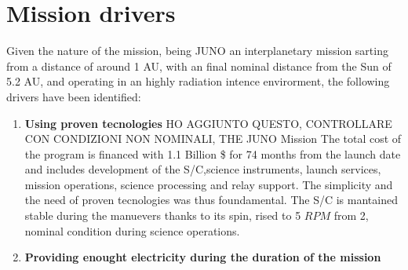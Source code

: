 \section{Mission drivers}
\label{sec:drivers}

Given the nature of the mission, being JUNO an interplanetary mission sarting from a distance of around 1 AU, with an final nominal distance from the Sun of 5.2 AU, and operating in an highly radiation 
intence envirorment, the following drivers have been identified: 

\begin{enumerate}[leftmargin=1.5em]
    \item \textbf{Using proven tecnologies} HO AGGIUNTO QUESTO, CONTROLLARE CON CONDIZIONI NON NOMINALI, THE JUNO Mission
    \newline The total cost of the program is financed with 1.1 Billion \$ for 74 months from the launch date and includes development of the S/C,science instruments, launch services, mission operations, science processing and relay support. The simplicity and the need of proven tecnologies was thus foundamental. The S/C is mantained stable during the manuevers thanks to its spin, rised to 5 $RPM$ from 2, nominal condition during science operations. 
    \item \textbf{Providing enought electricity during the duration of the mission} 
    \label{solar drivers}

\end{enumerate}
